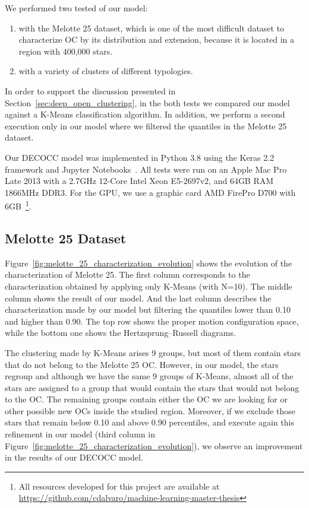 \documentclass[11pt,a4paper,english,twocolumn]{article}
\begin{document}
We performed two tested of our model:

\begin{enumerate}
  \item with the Melotte 25 dataset, which is one of the most difficult dataset to characterize OC by its distribution and extension, because it is located in a region with 400,000 stars.
  \item with a variety of clusters of different typologies.
\end{enumerate}

In order to support the discussion presented in Section~\ref{sec:deep_open_clustering}, in the both tests we compared our model against a K-Means classification algorithm. In addition, we perform a second execution only in our model where we filtered the quantiles in the Melotte 25 dataset.

Our DECOCC model was implemented in Python 3.8 using the Keras 2.2 framework and Jupyter Notebooks~\cite{Kluyver2016jupyter}. All tests were run on an Apple Mac Pro Late 2013 with a 2.7GHz 12-Core Intel Xeon E5-2697v2, and 64GB RAM 1866MHz DDR3. For the GPU, we use a graphic card AMD FirePro D700 with 6GB~\footnote{All resources developed for this project are available at \href{https://github.com/cdalvaro/machine-learning-master-thesis}{https://github.com/cdalvaro/machine-learning-master-thesis}}.

\subsection{Melotte 25 Dataset}

Figure~\ref{fig:melotte_25_characterization_evolution} shows the evolution of the characterization of Melotte 25. The first column corresponds to the characterization obtained by applying only K-Means (with N=10). The middle column shows the result of our model. And the last column describes the characterization made by our model but filtering the quantiles lower than 0.10 and higher than 0.90. The top row shows the proper motion configuration space, while the bottom one shows the Hertzsprung–Russell diagrams.


The clustering made by K-Means arises 9 groups, but most of them contain stars that do not belong to the Melotte 25 OC. However, in our model, the stars regroup and although we have the same 9 groups of K-Means, almost all of the stars are assigned to a group that would contain the stars that would not belong to the OC. The remaining groups contain either the OC we are looking for or other possible new OCs inside the studied region. Moreover, if we exclude those stars that remain below 0.10 and above 0.90 percentiles, and execute again this refinement in our model (third column in Figure~\ref{fig:melotte_25_characterization_evolution}), we observe an improvement in the results of our DECOCC model.
\end{document}
